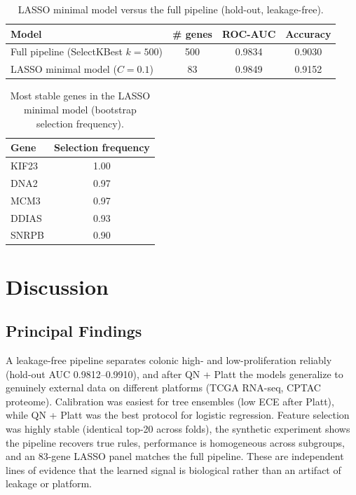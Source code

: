 \documentclass[11pt]{article}
\begin{document}
\begin{table}[htbp]
\centering
\caption{LASSO minimal model versus the full pipeline (hold-out, leakage-free).}
\label{tab:lasso}
\begin{tabular}{lccc}
\toprule
\textbf{Model} & \textbf{\# genes} & \textbf{ROC-AUC} & \textbf{Accuracy} \\
\midrule
Full pipeline (SelectKBest $k=500$) & 500 & 0.9834 & 0.9030 \\
LASSO minimal model ($C=0.1$) & 83 & 0.9849 & 0.9152 \\
\bottomrule
\end{tabular}
\end{table}

\begin{table}[htbp]
\centering
\caption{Most stable genes in the LASSO minimal model (bootstrap selection frequency).}
\label{tab:lassostab}
\begin{tabular}{lc}
\toprule
\textbf{Gene} & \textbf{Selection frequency} \\
\midrule
KIF23 & 1.00 \\
DNA2 & 0.97 \\
MCM3 & 0.97 \\
DDIAS & 0.93 \\
SNRPB & 0.90 \\
\bottomrule
\end{tabular}
\end{table}

\section{Discussion}

\subsection{Principal Findings}
A leakage-free pipeline separates colonic high- and low-proliferation reliably (hold-out AUC 0.9812--0.9910), and after QN + Platt the models generalize to genuinely external data on different platforms (TCGA RNA-seq, CPTAC proteome). Calibration was easiest for tree ensembles (low ECE after Platt), while QN + Platt was the best protocol for logistic regression. Feature selection was highly stable (identical top-20 across folds), the synthetic experiment shows the pipeline recovers true rules, performance is homogeneous across subgroups, and an 83-gene LASSO panel matches the full pipeline. These are independent lines of evidence that the learned signal is biological rather than an artifact of leakage or platform.
\end{document}

